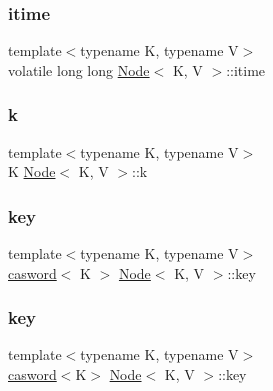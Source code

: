 \mbox{\label{classNode_a43227ccd8b7604ac51336fd368451784}} 
\subsubsection{\texorpdfstring{itime}{itime}}
{\footnotesize\ttfamily template$<$typename K, typename V$>$ \\
volatile long long \hyperlink{classNode}{Node}$<$ K, V $>$\+::itime}

\mbox{\label{classNode_a3a7754a22c66b5300a2892b18bc66c3f}} 
\subsubsection{\texorpdfstring{k}{k}}
{\footnotesize\ttfamily template$<$typename K, typename V$>$ \\
K \hyperlink{classNode}{Node}$<$ K, V $>$\+::k}

\mbox{\label{classNode_a0d5f29b75d1a6c47ef08c2bc993f03c0}} 
\subsubsection{\texorpdfstring{key}{key}\hspace{0.1cm}{\footnotesize\ttfamily [1/3]}}
{\footnotesize\ttfamily template$<$typename K, typename V$>$ \\
\hyperlink{structcasword}{casword}$<$ K $>$ \hyperlink{classNode}{Node}$<$ K, V $>$\+::key}

\mbox{\label{classNode_ad0930076f2ac755390423b48c6856cfa}} 
\subsubsection{\texorpdfstring{key}{key}\hspace{0.1cm}{\footnotesize\ttfamily [2/3]}}
{\footnotesize\ttfamily template$<$typename K, typename V$>$ \\
\hyperlink{structcasword}{casword}$<$K$>$ \hyperlink{classNode}{Node}$<$ K, V $>$\+::key}

\mbox{\label{classNode_a4091ccbd4f0b78711f848a5129fdece9}} 
